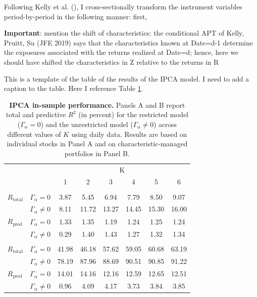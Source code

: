 \documentclass[
  12pt,
  a4paper,
  openany]{scrbook}
\begin{document}
Following Kelly et al.
(), I cross-sectionally
transform the instrument variables period-by-period in the following
manner: first,

\textbf{Important}: mention the shift of characteristics: the
conditional APT of Kelly, Pruitt, Su (JFE 2019) says that the
characteristics known at Date=d-1 determine the exposures associated
with the returns realized at Date=d; hence, here we should have shifted
the characteristics in Z relative to the returns in R

This is a template of the table of the results of the IPCA model. I need
to add a caption to the table. Here I reference Table
\ref{tbl-ipca_results}.

\begin{table}
\centering
\small
\caption[IPCA in-sample performance.]%
{%
\textbf{IPCA in-sample performance.}
Panels A and B report total and predictive $R^2$ (in percent) for the restricted model ($\Gamma_\alpha = 0$) and the unrestricted model ($\Gamma_\alpha \neq 0$) across different values of $K$ using daily data. Results are based on individual stocks in Panel A and on characteristic-managed portfolios in Panel B. 
}
\label{tbl-ipca_results}
\vspace{5pt} %
\begin{tabular}{lccccccc}
\toprule
 &  & \multicolumn{6}{c}{K} \\
\cmidrule(lr){3-8}
 &  & 1 & 2 & 3 & 4 & 5 & 6 \\
\midrule\addlinespace[2.5pt]
\multicolumn{8}{l}{Panel A: Individual stocks ($r_t$)} \\[2.5pt]
\midrule\addlinespace[2.5pt]
$R_{\text{total}}$      & $\Gamma_{\alpha} = 0$     & 3.87 & 5.45 & 6.94 & 7.79 & 8.50 & 9.07 \\
                            & $\Gamma_{\alpha} \neq 0$  & 8.11 & 11.72 & 13.27 & 14.45 & 15.30 & 16.00 \\
$R_{\text{pred}}$ & $\Gamma_{\alpha} = 0$     & 1.33 & 1.35 & 1.19 & 1.24 & 1.25 & 1.24 \\
                            & $\Gamma_{\alpha} \neq 0$  & 0.29 & 1.40 & 1.43 & 1.27 & 1.32 & 1.34 \\
\midrule\addlinespace[2.5pt]
\multicolumn{8}{l}{Panel B: Managed portfolios ($x_t$)} \\[2.5pt]
\midrule\addlinespace[2.5pt]
$R_{\text{total}}$      & $\Gamma_{\alpha} = 0$     & 41.98 & 46.18 & 57.62 & 59.05 & 60.68 & 63.19 \\
                            & $\Gamma_{\alpha} \neq 0$  & 78.19 & 87.96 & 88.69 & 90.51 & 90.85 & 91.22 \\
$R_{\text{pred}}$ & $\Gamma_{\alpha} = 0$     & 14.01 & 14.16 & 12.16 & 12.59 & 12.65 & 12.51 \\
                            & $\Gamma_{\alpha} \neq 0$  & 0.96 & 4.09 & 4.17 & 3.73 & 3.84 & 3.85 \\
\bottomrule
\end{tabular}
\end{table}
\end{document}
